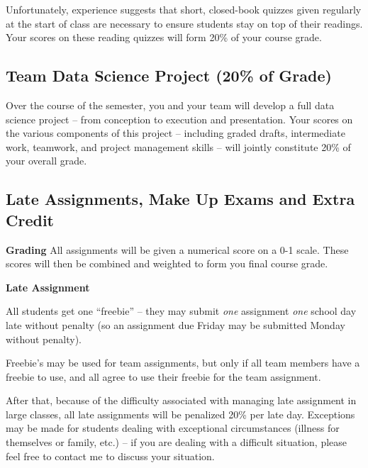 \documentclass[12pt]{article}
\begin{document}
Unfortunately, experience suggests that short, closed-book quizzes given regularly at the start of class are necessary to ensure students stay on top of their readings. Your scores on these reading quizzes will form 20\% of your course grade.

\subsection{Team Data Science Project (20\% of Grade)}

Over the course of the semester, you and your team will develop a full data science project -- from conception to execution and presentation. Your scores on the various components of this project -- including graded drafts, intermediate work, teamwork, and project management skills -- will jointly constitute 20\% of your overall grade.

\subsection{Late Assignments, Make Up Exams and Extra Credit}


\textbf{Grading}
All assignments will be given a numerical score on a 0-1 scale.  These scores will then be combined and weighted to form you final course grade.

\textbf{Late Assignment}

All students get one ``freebie'' -- they may submit \emph{one} assignment \emph{one} school day late without penalty (so an assignment due Friday may be submitted Monday without penalty).

Freebie's may be used for team assignments, but only if all team members have a freebie to use, and all agree to use their freebie for the team assignment.

After that, because of the difficulty associated with managing late assignment in large classes, all late assignments will be penalized 20\% per late day. Exceptions may be made for students dealing with exceptional circumstances (illness for themselves or family, etc.) -- if you are dealing with a difficult situation, please feel free to contact me to discuss your situation.
\end{document}
